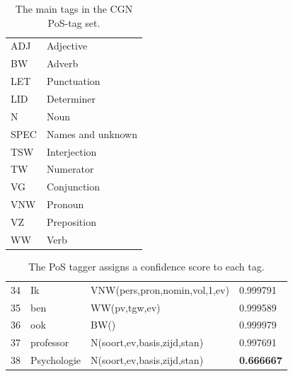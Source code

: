 \documentclass{book}
\begin{document}
\begin{table}[h]
\begin{tabular}{ll}
ADJ & Adjective\\
BW & Adverb\\
LET & Punctuation\\
LID & Determiner\\
N & Noun\\
SPEC & Names and unknown\\
TSW & Interjection\\
TW & Numerator\\
VG & Conjunction\\
VNW & Pronoun\\
VZ & Preposition\\
WW & Verb\\
\end{tabular}
\caption{\label{tab-pos-tags} The main tags in the CGN PoS-tag set.}
\end{table}


\begin{table}[h]
\begin{tabular}{llll}
34 &	Ik		&	VNW(pers,pron,nomin,vol,1,ev) &	0.999791\\
35 &	ben		&	WW(pv,tgw,ev) &	0.999589\\
36 &	ook		&	BW()&	0.999979\\
37 &	professor	&		N(soort,ev,basis,zijd,stan)	& 0.997691	\\
38 &	Psychologie	&		N(soort,ev,basis,zijd,stan) & {\bf 0.666667}\\
\end{tabular}
\caption{\label{tab-pos-conf} The PoS tagger assigns a confidence score to each tag.}
\end{table}
\end{document}
